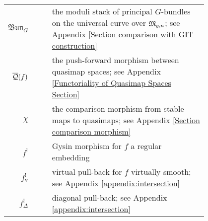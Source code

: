 \begin{longtabu}{r c c p{0.8\linewidth}}
$\mathfrak{Bun}_{G}$ & & & the moduli stack of principal $G$-bundles on the universal curve over $\mathfrak M_{g,n}$; see Appendix \ref{Section comparison with GIT construction} \\
$\overline{\mathcal{Q}}(f)$ & & & the push-forward morphism between quasimap spaces; see Appendix \ref{Functoriality of Quasimap Spaces Section} \\
$\chi$ & & & the comparison morphism from stable maps to quasimaps; see Appendix \ref{Section comparison morphism} \\
$f^!$ & & & Gysin morphism for $f$ a regular embedding \\
$f^!_{\text{v}}$ & & & virtual pull-back for $f$ virtually smooth; see Appendix \ref{appendix:intersection} \\
$f^!_{\Delta}$ & & & diagonal pull-back; see Appendix \ref{appendix:intersection}
\end{longtabu}

\pagebreak

